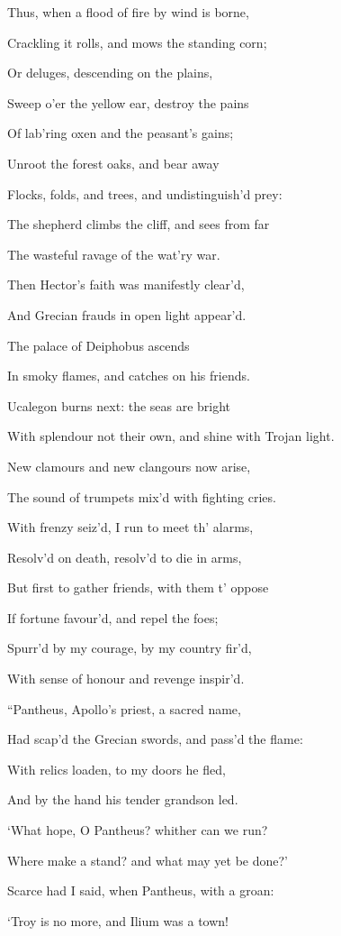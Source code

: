 Thus, when a flood of fire by wind is borne,

Crackling it rolls, and mows the standing corn;

Or deluges, descending on the plains,

Sweep o’er the yellow ear, destroy the pains

Of lab’ring oxen and the peasant’s gains;

Unroot the forest oaks, and bear away

Flocks, folds, and trees, and undistinguish’d prey:

The shepherd climbs the cliff, and sees from far

The wasteful ravage of the wat’ry war.

Then Hector’s faith was manifestly clear’d,

And Grecian frauds in open light appear’d.

The palace of Deiphobus ascends

In smoky flames, and catches on his friends.

Ucalegon burns next: the seas are bright

With splendour not their own, and shine with Trojan light.

New clamours and new clangours now arise,

The sound of trumpets mix’d with fighting cries.

With frenzy seiz’d, I run to meet th’ alarms,

Resolv’d on death, resolv’d to die in arms,

But first to gather friends, with them t’ oppose

If fortune favour’d, and repel the foes;

Spurr’d by my courage, by my country fir’d,

With sense of honour and revenge inspir’d.

“Pantheus, Apollo’s priest, a sacred name,

Had scap’d the Grecian swords, and pass’d the flame:

With relics loaden, to my doors he fled,

And by the hand his tender grandson led.

‘What hope, O Pantheus? whither can we run?

Where make a stand? and what may yet be done?’

Scarce had I said, when Pantheus, with a groan:

‘Troy is no more, and Ilium was a town!

